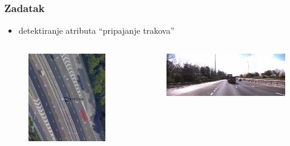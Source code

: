 \documentclass{beamer}
\begin{document}
\begin{frame}
 \frametitle{Zadatak}
 \begin{itemize}
  \item detektiranje atributa ``pripajanje trakova''
 \end{itemize}

 \begin{columns}
\begin{column}{0.5\textwidth}

\begin{figure}[H]
\centering
\includegraphics[scale=0.25]{images/sattelite.png}
\end{figure} 

\end{column}

\begin{column}{0.5\textwidth}
\begin{figure}[H]
\centering
\includegraphics[scale=0.19]{images/car.png}
\end{figure} 


\end{column}
\end{columns}
\end{frame}
\end{document}
